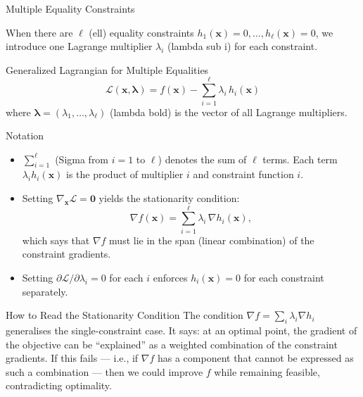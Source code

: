 \documentclass[aspectratio=169,10pt]{beamer}
\newcommand{\bx}{\mathbf{x}}
\newcommand{\blambda}{\bm{\lambda}}
\newcommand{\Lagr}{\mathcal{L}}
\begin{document}
\begin{frame}[allowframebreaks]{Multiple Equality Constraints}

  When there are $\ell$ (ell) equality constraints $h_1(\bx) = 0, \ldots,
  h_\ell(\bx) = 0$, we introduce one Lagrange multiplier $\lambda_i$ (lambda
  sub i) for each constraint.

  \begin{block}{Generalized Lagrangian for Multiple Equalities}
    \[
      \Lagr(\bx, \blambda) = f(\bx) - \sum_{i=1}^{\ell} \lambda_i\,h_i(\bx)
    \]
    where $\blambda = (\lambda_1, \ldots, \lambda_\ell)$ (lambda bold) is the
    vector of all Lagrange multipliers.
  \end{block}

  \begin{block}{Notation}
    \begin{itemize}
      \item $\sum_{i=1}^{\ell}$ (Sigma from $i=1$ to $\ell$) denotes the sum
            of $\ell$ terms.  Each term $\lambda_i h_i(\bx)$ is the product of
            multiplier $i$ and constraint function $i$.
      \item Setting $\nabla_\bx \Lagr = \mathbf{0}$ yields the stationarity
            condition:
            \[
              \nabla f(\bx) = \sum_{i=1}^{\ell} \lambda_i\,\nabla h_i(\bx),
            \]
            which says that $\nabla f$ must lie in the span (linear combination)
            of the constraint gradients.
      \item Setting $\partial \Lagr / \partial \lambda_i = 0$ for each $i$
            enforces $h_i(\bx) = 0$ for each constraint separately.
    \end{itemize}
  \end{block}

  \begin{alertblock}{How to Read the Stationarity Condition}
    The condition $\nabla f = \sum_i \lambda_i \nabla h_i$ generalises the
    single-constraint case.  It says: at an optimal point, the gradient of the
    objective can be ``explained'' as a weighted combination of the constraint
    gradients.  If this fails --- i.e., if $\nabla f$ has a component that
    cannot be expressed as such a combination --- then we could improve $f$
    while remaining feasible, contradicting optimality.
  \end{alertblock}

\end{frame}
\end{document}
